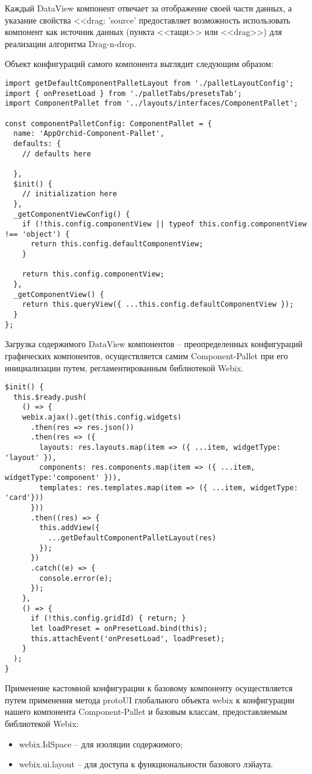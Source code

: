 Каждый DataView компонент отвечает за отображение своей части данных, а указание свойства <<drag: 'source' предоставляет возможность использовать компонент как источник данных (пункта <<тащи>> или <<drag>>) для реализации алгоритма Drag-n-drop.

Объект конфигураций самого компонента выглядит следующим образом:

\begin{lstlisting}
import getDefaultComponentPalletLayout from './palletLayoutConfig';
import { onPresetLoad } from './palletTabs/presetsTab';
import ComponentPallet from '../layouts/interfaces/ComponentPallet';

const componentPalletConfig: ComponentPallet = {
  name: 'AppOrchid-Component-Pallet',
  defaults: {
    // defaults here

  },
  $init() {
    // initialization here
  },
  _getComponentViewConfig() {
    if (!this.config.componentView || typeof this.config.componentView !== 'object') {
      return this.config.defaultComponentView;
    }

    return this.config.componentView;
  },
  _getComponentView() {
    return this.queryView({ ...this.config.defaultComponentView });
  }
};
\end{lstlisting}

Загрузка содержимого DataView компонентов -- преопределенных конфигураций графических компонентов, осуществляется самим Component-Pallet при его инициализации путем, регламентированным библиотекой Webix.

\begin{lstlisting}
$init() {
  this.$ready.push(
    () => {
    webix.ajax().get(this.config.widgets)
      .then(res => res.json())
      .then(res => ({
        layouts: res.layouts.map(item => ({ ...item, widgetType: 'layout' }),
        components: res.components.map(item => ({ ...item, widgetType:'component' })),
        templates: res.templates.map(item => ({ ...item, widgetType: 'card'}))
      }))
      .then((res) => {
        this.addView({
          ...getDefaultComponentPalletLayout(res)
        });
      })
      .catch((e) => {
        console.error(e);
      });
    },
    () => {
      if (!this.config.gridId) { return; }
      let loadPreset = onPresetLoad.bind(this);
      this.attachEvent('onPresetLoad', loadPreset);
    }
  );
}
\end{lstlisting}

Применение кастомной конфигурации к базовому компоненту осуществляется путем применения метода protoUI глобального объекта webix к конфигурации нашего компонента Component-Pallet и базовым классам, предоставляемым библиотекой Webix:
\begin{itemize}
    \item webix.IdSpace -- для изоляции содержимого;
    \item webix.ui.layout -- для доступа к функциональности базового лэйаута.
\end{itemize}

